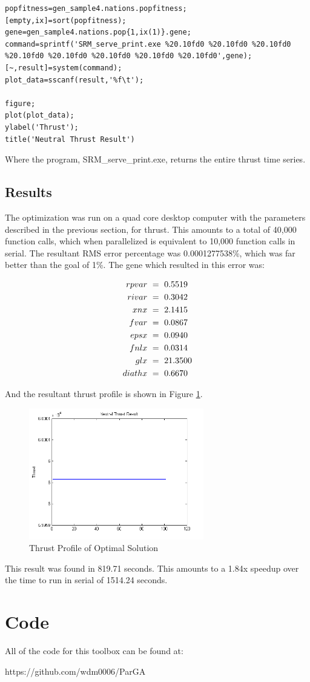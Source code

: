 \documentclass[conference]{IEEEtran}
\begin{document}
\begin{minipage}{0.43\textwidth}
\begin{lstlisting}
popfitness=gen_sample4.nations.popfitness;
[empty,ix]=sort(popfitness);
gene=gen_sample4.nations.pop{1,ix(1)}.gene;
command=sprintf('SRM_serve_print.exe %20.10fd0 %20.10fd0 %20.10fd0 %20.10fd0 %20.10fd0 %20.10fd0 %20.10fd0 %20.10fd0',gene);
[~,result]=system(command);
plot_data=sscanf(result,'%f\t');

figure;
plot(plot_data);
ylabel('Thrust');
title('Neutral Thrust Result')
\end{lstlisting}
\end{minipage}

Where the program, SRM\_serve\_print.exe, returns the entire thrust time series.

\subsection{Results}

The optimization was run on a quad core desktop computer with the parameters described in the previous section, for thrust.  This amounts to a total of 40,000 function calls, which when parallelized is equivalent to 10,000 function calls in serial.  The resultant RMS error percentage was 0.0001277538\%, which was far better than the goal of 1\%.  The gene which resulted in this error was:

\begin{align}\notag
rpvar\ &=\ 0.5519\\\notag
 rivar\ &=\ 0.3042\\\notag 
 xnx\ &=\ 2.1415\\\notag
 fvar\ &=\ 0.0867\\\notag
  epsx\ &=\ 0.0940\\\notag
fnlx\ &=\ 0.0314\\\notag
glx\ &=\ 21.3500\\\notag
 diathx\ &=\ 0.6670\notag
 \end{align}

And the resultant thrust profile is shown in Figure \ref{fig:thrust}.

\begin{figure}[h!t]
 \centering
    \includegraphics[width=3in]{thrust.PNG}
    \caption{Thrust Profile of Optimal Solution}
    \label{fig:thrust}
\end{figure}


This result was found in 819.71 seconds.  This amounts to a 1.84x speedup over the time to run in serial of 1514.24 seconds. 

\section{Code}

All of the code for this toolbox can be found at:

https://github.com/wdm0006/ParGA
% 
%
\end{document}
